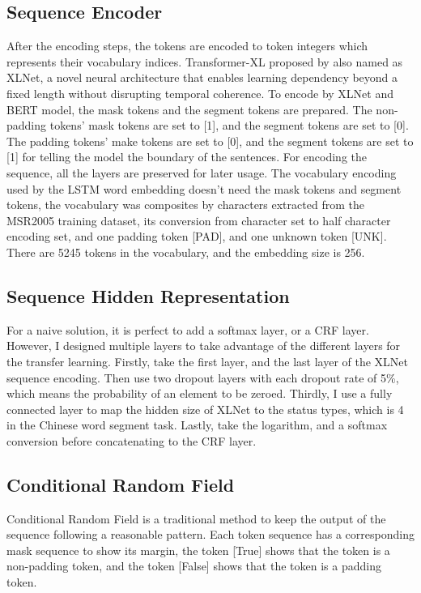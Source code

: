 \documentclass[11pt,a4paper]{article}
\begin{document}
\subsection{Sequence Encoder}

After the encoding steps, the tokens are encoded to token integers which represents their vocabulary indices.
Transformer-XL proposed by \citet{dai2019transformer} also named as XLNet, a novel neural architecture that enables learning dependency beyond a fixed length without disrupting temporal coherence.
To encode by XLNet and BERT model, the mask tokens and the segment tokens are prepared.
The non-padding tokens' mask tokens are set to [1], and the segment tokens are set to [0].
The padding tokens' make tokens are set to [0], and the segment tokens are set to [1] for telling the model the boundary of the sentences.
For encoding the sequence, all the layers are preserved for later usage.
The vocabulary encoding used by the LSTM word embedding doesn't need the mask tokens and segment tokens,
the vocabulary was composites by characters extracted from the MSR2005 training dataset, its conversion from character set to half character encoding set,
and one padding token [PAD], and one unknown token [UNK].
There are 5245 tokens in the vocabulary, and the embedding size is 256.

\subsection{Sequence Hidden Representation}

For a naive solution, it is perfect to add a softmax layer, or a CRF layer.
However, I designed multiple layers to take advantage of the different layers for the transfer learning.
Firstly, take the first layer, and the last layer of the XLNet sequence encoding.
Then use two dropout layers with each dropout rate of 5\%, which means the probability of an element to be zeroed.
Thirdly, I use a fully connected layer to map the hidden size of XLNet to the status types, which is 4 in the Chinese word segment task.
Lastly, take the logarithm, and a softmax conversion before concatenating to the CRF layer.


\subsection{Conditional Random Field}

Conditional Random Field is a traditional method to keep the output of the sequence following a reasonable pattern.
Each token sequence has a corresponding mask sequence to show its margin, the token [True] shows that the token is a non-padding token,
and the token [False] shows that the token is a padding token.
\end{document}
